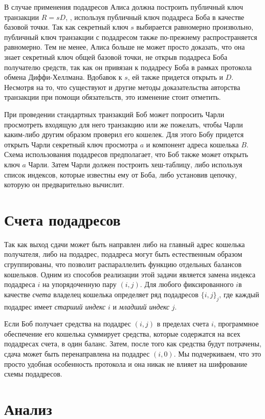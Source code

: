 \documentclass{mrl}
\begin{document}
В случае применения подадресов Алиса должна построить публичный ключ транзакции $R = sD$, , используя публичный ключ подадреса Боба в качестве базовой точки. Так как секретный ключ $s$ выбирается равномерно произвольно, публичный ключ транзакции с подадресом также по-прежнему распространяется равномерно. Тем не менее, Алиса больше не может просто доказать, что она знает секретный ключ общей базовой точки, не открыв подадреса Боба получателю средств, так как он привязан к подадресу Боба в рамках протокола обмена Диффи-Хеллмана. Вдобавок к $s$, ей также придется открыть и $D$. Несмотря на то, что существуют и другие методы доказательства авторства транзакции при помощи обязательств, это изменение стоит отметить.

При проведении стандартных транзакций Боб может попросить Чарли просмотреть входящую для него транзакцию или же пожелать, чтобы Чарли каким-либо другим образом проверил его кошелек. Для этого Бобу придется открыть Чарли секретный ключ просмотра $a$ и компонент адреса кошелька $B$. Схема использования подадресов предполагает, что Боб также может открыть ключ $a$ Чарли. Затем Чарли должен построить хеш-таблицу, либо используя список индексов, которые известны ему от Боба, либо установив цепочку, которую он предварительно вычислит.


\section{Счета подадресов}
Так как выход сдачи может быть направлен либо на главный адрес кошелька получателя, либо на подадрес, подадреса могут быть естественным образом сгруппированы, что позволит распараллелить функцию отдельных балансов кошельков. Одним из способов реализации этой задачи является замена индекса подадреса $i$ на упорядоченную пару $(i,j)$. Для любого фиксированного $i$в качестве \textit{счета} владелец кошелька определяет ряд подадресов $\{i,j\}_j$, где каждый подадрес имеет \textit{старший индекс} $i$ и \textit{младший индекс} $j$.

Если Боб получает средства на подадрес $(i,j)$ в пределах счета $i$, программное обеспечение его кошелька суммирует средства, которые содержатся на всех подадресах счета, в один баланс. Затем, после того как средства будут потрачены, сдача может быть перенаправлена на подадрес $(i,0)$. Мы подчеркиваем, что это просто удобная особенность протокола и она никак не влияет на шифрование схемы подадресов.


\section{Анализ}
\end{document}
